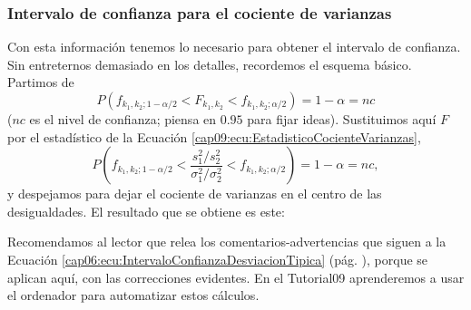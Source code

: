 \subsubsection{Intervalo de confianza para el cociente de varianzas}
\label{cap09:subsec:IntervaloConfianzaCocienteVarianzas}

Con esta información tenemos lo necesario para obtener el intervalo de confianza. Sin entreternos demasiado en los detalles, recordemos el esquema básico. Partimos de
\[P\left(f_{k_1,k_2;1-\alpha/2}< F_{k_1,k_2} <f_{k_1,k_2;\alpha/2}\right)=1-\alpha=nc\]
($nc$ es el nivel de confianza; piensa en $0.95$ para fijar ideas). Sustituimos aquí $F$ por el estadístico de la Ecuación \ref{cap09:ecu:EstadisticoCocienteVarianzas},
    \[P\left(f_{k_1,k_2;1-\alpha/2}< \dfrac{s_1^2/s_2^2}{\sigma_1^2/\sigma_2^2}< f_{k_1,k_2;\alpha/2}\right) =1-\alpha=nc,
    \]
y despejamos para dejar el cociente de varianzas en el centro de las desigualdades. El resultado que se obtiene es este:
\begin{center}
\end{center}
Recomendamos al lector que relea los comentarios-advertencias que siguen a la Ecuación \ref{cap06:ecu:IntervaloConfianzaDesviacionTipica} (pág. \pageref{cap06:ecu:IntervaloConfianzaDesviacionTipica}), porque se aplican aquí, con las correcciones evidentes. En el Tutorial09 aprenderemos a usar el ordenador para automatizar estos cálculos.

